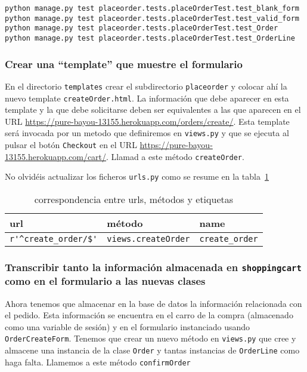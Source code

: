 \documentclass[12pt]{article} %
\newcommand{\ttt}[1]{\texttt{#1}}%
\newcommand{\hhh}[1]{\texttt{#1}}%
\newcommand{\views}{\texttt{views.py}}%
\newcommand{\urls}{\texttt{urls.py}}%
\begin{document}
\begin{verbatim}
python manage.py test placeorder.tests.placeOrderTest.test_blank_form 
python manage.py test placeorder.tests.placeOrderTest.test_valid_form 
python manage.py test placeorder.tests.placeOrderTest.test_Order
python manage.py test placeorder.tests.placeOrderTest.test_OrderLine

\end{verbatim}


\subsubsection{Crear una ``template'' que muestre  el formulario}
En el directorio \ttt{templates} crear el subdirectorio \ttt{placeorder} y colocar ahí la nuevo template \hhh{createOrder.html}. La información que debe aparecer en esta template y la que debe solicitarse deben ser equivalentes a las que aparecen en el URL \url{https://pure-bayou-13155.herokuapp.com/orders/create/}. Esta template será invocada por un metodo que definiremos en \views{} y que se ejecuta al pulsar el botón \ttt{Checkout} en el URL \url{https://pure-bayou-13155.herokuapp.com/cart/}. Llamad a este método \ttt{createOrder}.

No olvidéis actualizar los ficheros \urls{} como se resume en la tabla~\ref{tab:urlsplaceorder}

\begin{table}[H]
\centering
\begin{tabular}{lll}
    \textbf{url} & \textbf{método} & \textbf{name} \\ \hline
 \verb|r'^create_order/$'|  & \verb|views.createOrder|  & \verb|create_order|\\
\end{tabular}
\caption{correspondencia entre urls, métodos y etiquetas}
\label{tab:urlsplaceorder}
\end{table}

\subsubsection{Transcribir tanto la información almacenada en \ttt{shoppingcart} como en el formulario a las nuevas clases}

Ahora tenemos que almacenar en la base de datos la información relacionada con el pedido. Esta información se encuentra en el carro de la compra (almacenado como una variable de sesión) y en el formulario instanciado usando \ttt{OrderCreateForm}. Tenemos que crear un nuevo método en \views{} que cree y almacene una instancia de la clase \ttt{Order} y tantas instancias de \ttt{OrderLine} como haga falta.  Llamemos a este método \ttt{confirmOrder} 
\end{document}
